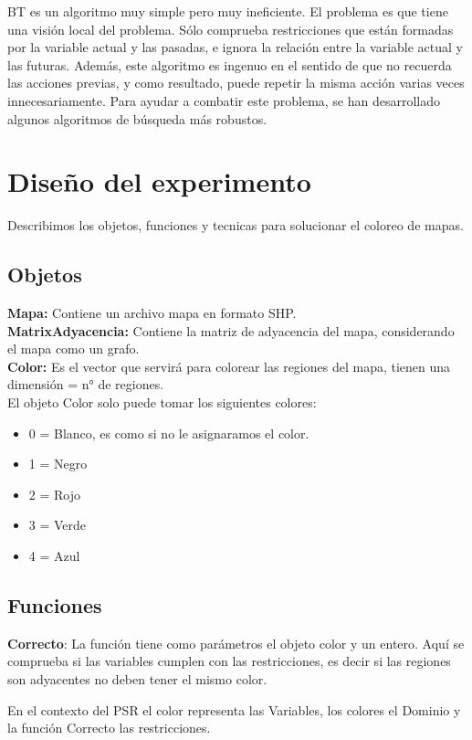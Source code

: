\documentclass[a4paper]{article}
\begin{document}
BT es un algoritmo muy simple pero muy ineficiente. El problema es que tiene una visión local del problema. Sólo comprueba restricciones que están formadas por la variable actual y las pasadas, e ignora la relación entre la variable actual y las futuras. Además, este algoritmo es ingenuo en el sentido de que no recuerda las acciones previas, y como resultado, puede repetir la misma acción varias veces innecesariamente. Para ayudar a combatir este problema, se han desarrollado algunos algoritmos de búsqueda más robustos.

 
\pagebreak

\section{Diseño del experimento}
Describimos los objetos, funciones y tecnicas para solucionar el coloreo de mapas.
\subsection{Objetos}
\textbf{Mapa:} Contiene un archivo mapa en formato SHP.\\ 
\textbf{MatrixAdyacencia:} Contiene la matriz de adyacencia del mapa, considerando el mapa como un grafo.\\
\textbf{Color:} Es el vector que servirá para colorear las regiones del mapa, tienen una dimensión = n° de regiones.\\ 
El objeto Color solo puede tomar los siguientes colores:

\begin{itemize}
	
\item 0 = Blanco, es como si no le asignaramos el color.
\item 1 = Negro
\item 2 = Rojo 
\item 3 = Verde 
\item 4 = Azul
\end{itemize}

\subsection{Funciones}
\textbf{Correcto}: La función tiene como parámetros el objeto color y un entero. Aquí se comprueba si las variables cumplen con las restricciones, es decir si las regiones son adyacentes no deben tener el mismo color. 

En el contexto del PSR el color representa las Variables, los colores el Dominio y la función Correcto las restricciones.
\end{document}
